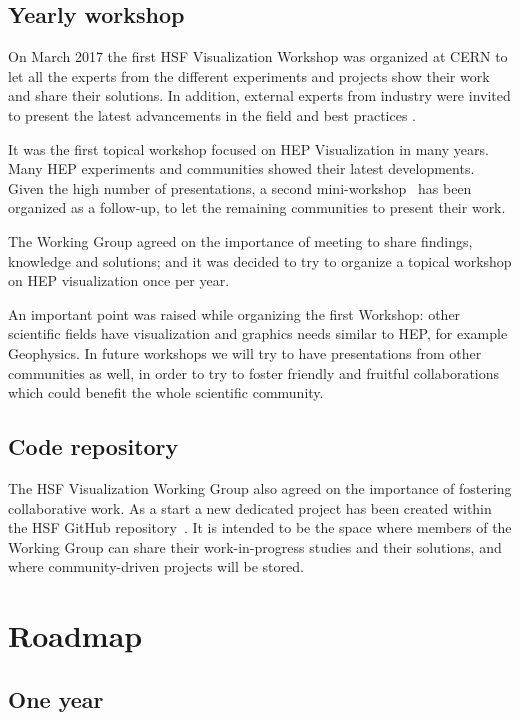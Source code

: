 \documentclass[12pt,a4paper]{article}
\begin{document}
\hypertarget{workshop}{%
\subsection{Yearly workshop}\label{workshop}}

On March 2017 the first HSF Visualization Workshop was organized at CERN to let all the experts from the different experiments and projects
show their work and share their solutions. In addition, external experts from industry were invited to present the latest
advancements in the field and best practices \cite{HSFViz2017}.

It was the first topical workshop focused on HEP Visualization in many years. Many HEP
experiments and communities showed their latest developments. Given the high number of presentations, a second mini-workshop~\cite{HSFViz2017Mini} has been organized as a follow-up, to let the remaining communities to present their work.

The Working Group agreed on the importance of meeting to share findings, knowledge and solutions; and it was decided to
try to organize a topical workshop on HEP visualization once per year.

An important point was raised while organizing the first Workshop: other scientific fields have visualization and
graphics needs similar to HEP, for example Geophysics. In future workshops we will try to
have presentations from other communities as well, in order to try to foster friendly and fruitful collaborations
which could benefit the whole scientific community.

\hypertarget{repo}{%
\subsection{Code repository}\label{repo}}

The HSF Visualization Working Group also agreed on the importance of fostering collaborative work.
As a start a new dedicated project has been created within the HSF GitHub repository~\cite{HSFVizRepo}.
It is intended to be the space where members of the Working Group can share their work-in-progress studies and their solutions, and where
community-driven projects will be stored.

\hypertarget{roadmap}{%
\section{Roadmap}\label{roadmap}}

\hypertarget{one-year}{%
\subsection{One year}\label{one-year}}
\end{document}
